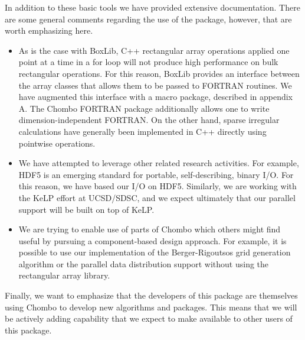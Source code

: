 In addition to these basic tools we have provided extensive
documentation.  There are some general comments regarding the use of
the package, however, that are worth emphasizing here.
\begin{itemize}
\item As is the case with BoxLib, C++ rectangular array operations
applied one point at a time in a for loop will not produce high
performance on bulk rectangular operations.  For this reason,  BoxLib 
provides an interface between the array classes that allows them to be
passed to FORTRAN routines.  We  have augmented this interface with a
macro package, described in appendix A.  The Chombo FORTRAN package
additionally allows one to write dimension-independent FORTRAN.  On the
other hand, sparse irregular calculations have generally been
implemented in C++ directly using pointwise operations.  

\item We have attempted to leverage other related research activities.
For example, HDF5 is an emerging standard for portable,
self-describing, binary I/O.  For this reason, we have based our I/O on
HDF5.   Similarly, we are working with the KeLP effort 
\cite{fink96:kelp} at UCSD/SDSC,
and we expect ultimately that our parallel support will be built on
top of KeLP.

\item We are trying to enable use of parts of Chombo which
others might find useful by pursuing a component-based design approach.
For example, it is possible to use our implementation of the
Berger-Rigoutsos \cite{bergerRigoutsos:1991} grid generation algorithm
or the parallel data distribution support without using the rectangular
array library.

\end{itemize}
Finally, we want to emphasize that the developers of this package are
themselves using Chombo to develop new algorithms and packages.  This
means that we will be actively adding capability  that we expect to
make available to other users of this package.


